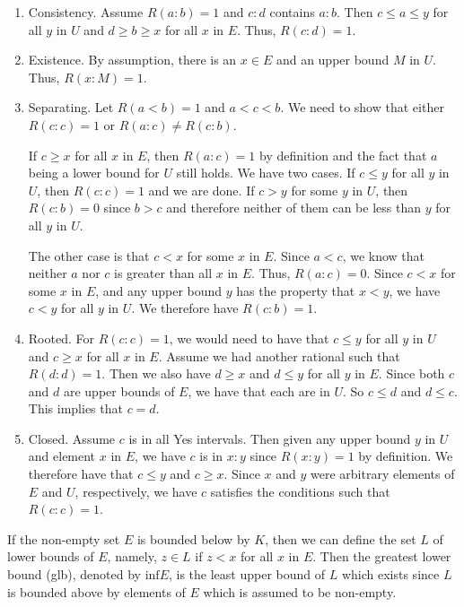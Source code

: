 \documentclass[12pt]{article}
\theoremstyle{remark}
\begin{document}
\begin{enumerate}
    \item Consistency. Assume $R(a:b)=1$ and $c:d$ contains $a:b$. Then $c \leq a \leq y$ for all $y$ in $U$ and $d \geq b \geq x$ for all $x$ in $E$. Thus, $R(c:d) = 1$.
    \item Existence. By assumption, there is an $x \in E$ and an upper bound $M$ in $U$. Thus, $R(x:M) = 1$. 
    \item Separating. Let $R(a\lt b)=1$ and $a < c< b$. We need to show that either $R(c:c)=1$ or $R(a:c) \neq R(c:b)$. 
    
    If $c \geq x$ for all $x$ in $E$, then $R(a:c)=1$ by definition and the fact that $a$ being a lower bound for $U$ still holds. We have two cases.  If $c \leq y$ for all $y$ in $U$, then $R(c:c)=1$ and we are done. If $c > y$ for some $y$ in $U$, then $R(c:b) = 0$ since $b > c$ and therefore neither of them can be less than $y$ for all $y$ in $U$. 
    
    The other case is that $c < x$ for some $x$ in $E$. Since $a < c$, we know that neither $a$ nor $c$ is greater than all $x$ in $E$. Thus, $R(a:c) = 0$. Since $c < x$ for some $x$ in $E$, and any upper bound $y$ has the property that $x < y$, we have $c < y$ for all $y$ in $U$. We therefore have $R(c:b)=1$.
    
    \item Rooted. For $R(c:c)=1$, we would need to have that $c \leq y$ for all $y$ in $U$ and $c \geq x$ for all $x$ in $E$. Assume we had another rational such that $R(d:d) = 1$. Then we also have $d \geq x$ and $d \leq y$ for all $y$ in $E$. Since both $c$ and $d$ are upper bounds of $E$, we have that each are in $U$. So $c \leq d$ and $d \leq c$. This implies that $c = d$. 
    \item Closed. Assume $c$ is in all Yes intervals. Then given any upper bound $y$ in $U$ and element $x$ in $E$, we have $c$ is in $x:y$ since $R(x:y)=1$ by definition. We therefore have that $c \leq y$ and $c \geq x$. Since $x$ and $y$ were arbitrary elements of $E$ and $U$, respectively, we have $c$ satisfies the conditions such that $R(c:c)=1$.
\end{enumerate}

If the non-empty set $E$ is bounded below by $K$, then we can define the set $L$ of lower bounds of $E$, namely, $z \in L$ if $z < x$ for all $x$ in $E$. Then the greatest lower bound (glb), denoted by $\mathrm{inf} E$, is the least upper bound of $L$ which exists since $L$ is bounded above by elements of $E$ which is assumed to be non-empty. 
\end{document}
